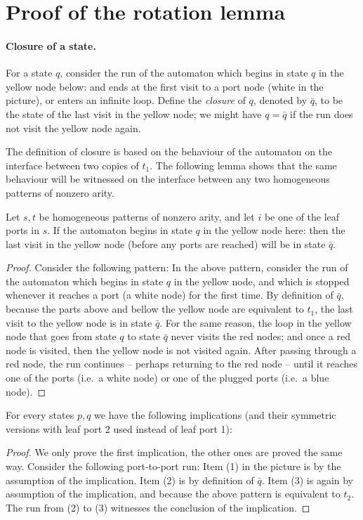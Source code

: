 \section{Proof of the rotation lemma}
\paragraph*{Closure of a state.} 
For a state $q$, consider the run of the automaton which begins in state $q$ in the yellow node below:
and ends at the first visit to a port node (white in the picture), or enters an infinite loop.
Define the \emph{closure} of $q$, denoted by  $\bar q$, to be the state of the last visit in the yellow node; we might have $q = \bar q$ if the run does not visit the yellow node again.

The definition of closure is based on the behaviour of the automaton on the interface between two copies of $t_1$. The following lemma shows that the same behaviour will be witnessed on the interface between any two homogeneous patterns of nonzero arity.
\begin{lemma}\label{lem:twa-bar}
  Let $s,t$ be homogeneous patterns of nonzero arity, and let $i$ be one of the leaf ports in $s$. If the automaton begins in state $q$ in the yellow node here: 
  then the last visit in the yellow node (before any  ports are reached) will be in state $\bar q$.
\end{lemma}
\begin{proof} 
Consider the following pattern:
In the above pattern,  consider the run of the automaton which begins in state $q$ in the yellow node, and which is stopped whenever it reaches a port (a white node) for the first time.  By definition of $\bar q$, because the parts above and bellow the yellow node are equivalent to $t_1$, the last visit to  the  yellow node is   in state $\bar q$. For the same reason, the loop in the yellow node that goes from state $q$ to state $\bar q$ never visits the red nodes; and once a red node is visited, then the yellow node  is not visited again. After passing through a red node, the run continues -- perhaps returning to the red node -- until it reaches one of the ports (i.e.~a white node) or one of the plugged ports (i.e.~a blue node). 
\end{proof}





\begin{lemma}\label{lem:closure-up} For every states $p,q$ we have the following implications (and their symmetric versions with leaf port 2 used instead of leaf port 1):
\end{lemma}
\begin{proof}
We only prove the first implication, the other ones are proved the same way.
Consider the following port-to-port run:
Item (1) in the picture is by the assumption of the implication. Item (2) is by definition of $\bar q$. Item (3) is again by assumption of the implication, and because  the above pattern is equivalent to $t_2$. The run from (2) to (3) witnesses the conclusion of the implication. \end{proof}

